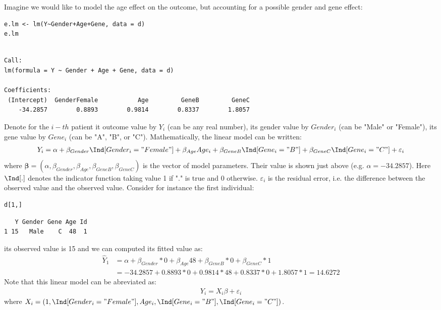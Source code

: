 \documentclass{article}
\begin{document}
Imagine we would like to model the age effect on the outcome, but
accounting for a possible gender and gene effect:
\lstset{language=r,label= ,caption= ,captionpos=b,numbers=none}
\begin{lstlisting}
e.lm <- lm(Y~Gender+Age+Gene, data = d)
e.lm
\end{lstlisting}

\begin{verbatim}

Call:
lm(formula = Y ~ Gender + Age + Gene, data = d)

Coefficients:
 (Intercept)  GenderFemale           Age         GeneB         GeneC  
    -34.2857        0.8893        0.9814        0.8337        1.8057
\end{verbatim}

Denote for the \(i-th\) patient it outcome value by \(Y_i\) (can be
any real number), its gender value by \(Gender_i\) (can be "Male" or
"Female"), its gene value by \(Gene_i\) (can be "A", "B", or
"C"). Mathematically, the linear model can be written:
\begin{align*}
Y_i = \alpha + \beta_{Gender} \Ind[Gender_i="Female"] + \beta_{Age} Age_i + \beta_{GeneB} \Ind[Gene_i="B"] + \beta_{GeneC} \Ind[Gene_i="C"] + \varepsilon_i
\end{align*}
where \(\boldsymbol{\beta} =
(\alpha,\beta_{Gender},\beta_{Age},\beta_{GeneB},\beta_{GeneC})\) is
the vector of model parameters. Their value is shown just above
(e.g. \(\alpha=-34.2857\)). Here \(\Ind[.]\) denotes the indicator
function taking value 1 if "." is true and 0
otherwise. \(\varepsilon_i\) is the residual error, i.e. the
difference between the observed value and the observed value. Consider
for instance the first individual:
\lstset{language=r,label= ,caption= ,captionpos=b,numbers=none}
\begin{lstlisting}
d[1,]
\end{lstlisting}

\begin{verbatim}
   Y Gender Gene Age Id
1 15   Male    C  48  1
\end{verbatim}
its observed value is 15 and we can computed its fitted value as:
\begin{align*}
\hat{Y}_1 &= \alpha + \beta_{Gender} * 0 + \beta_{Age} 48 + \beta_{GeneB} * 0 + \beta_{GeneC} * 1 \\
          &= -34.2857 + 0.8893 * 0 + 0.9814 * 48 + 0.8337 * 0 + 1.8057 * 1 = 14.6272
\end{align*}
Note that this linear model can be abreviated as:
\begin{align*}
Y_i = X_i \beta + \varepsilon_i
\end{align*}
where \(X_i = \left(1, \Ind[Gender_i="Female"], Age_i,
\Ind[Gene_i="B"], \Ind[Gene_i="C"]\right)\).
\end{document}
